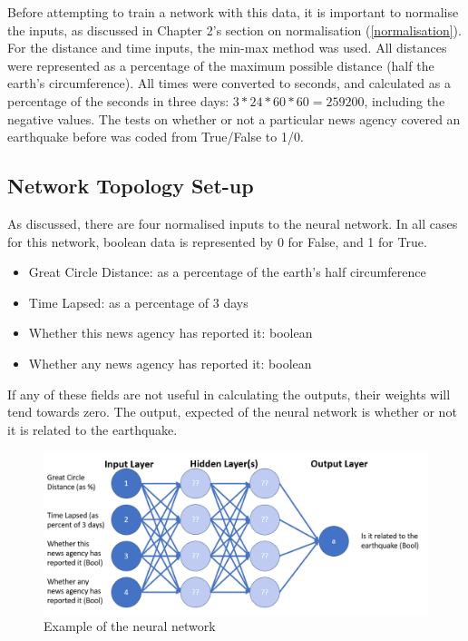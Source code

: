 Before attempting to train a network with this data, it is important to normalise the inputs, as discussed in Chapter 2's section on normalisation (\ref{normalisation}). For the distance and time inputs, the min-max method was used. All distances were represented as a percentage of the maximum possible distance (half the earth's circumference). All times were converted to seconds, and calculated as a percentage of the seconds in three days: $3 * 24 * 60 * 60 = 259 200$, including the negative values. The tests on whether or not a particular news agency covered an earthquake before was coded from True/False to 1/0.

\subsection{Network Topology Set-up}

As discussed, there are four normalised inputs to the neural network. In all cases for this network, boolean data is represented by 0 for False, and 1 for True.
\begin{itemize}
  \item Great Circle Distance: as a percentage of the earth’s half circumference
  \item Time Lapsed: as a percentage of 3 days
  \item Whether this news agency has reported it: boolean
  \item Whether any news agency has reported it: boolean
\end{itemize}

If any of these fields are not useful in calculating the outputs, their weights will tend towards zero. The output, expected of the neural network is whether or not it is related to the earthquake.

\begin{figure}[H]
\caption{Example of the neural network}
\centering
\includegraphics[width=1.0\textwidth]{Figures/SampleNetwork.PNG}
\end{figure}


